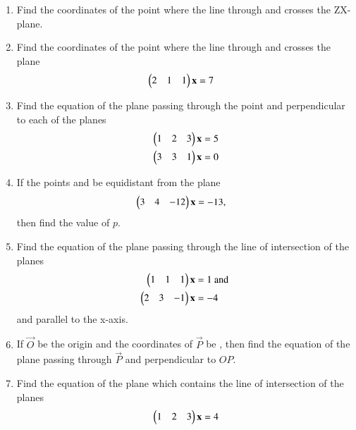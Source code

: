 \begin{enumerate}[label=\arabic*.,ref=\thesubsection.\theenumi]
\item Find the coordinates of the point where the line through  and  crosses the ZX-plane.
\item Find the coordinates of the point where the line through  and  crosses the plane 
\begin{align}
\begin{pmatrix}2 & 1 & 1\end{pmatrix}\mathbf{x}&=7
\end{align}
%
\item Find the equation of the plane passing through the point  and perpendicular to each of the planes 
\begin{align}
\begin{pmatrix}1 & 2 & 3\end{pmatrix}\mathbf{x}&=5
\\
\begin{pmatrix}3 & 3 & 1\end{pmatrix}\mathbf{x}&=0
\end{align}
\item If the points  and  be equidistant from the plane 
\begin{align}
\begin{pmatrix}3 & 4 & -12\end{pmatrix}\mathbf{x}&=-13,
\end{align}
%
then find the value of $p$.
\item Find the equation of the plane passing through the line of intersection of the planes 
\begin{align}
\begin{pmatrix}1 & 1 & 1\end{pmatrix}\mathbf{x}&=1 \text{ and }
\\
\begin{pmatrix}2 & 3 & -1\end{pmatrix}\mathbf{x}&=-4
\end{align}
%
and parallel to the x-axis.
\item If $\vec{O}$ be the origin and the coordinates of $\vec{P}$ be , then find the equation of the plane passing through $\vec{P}$ and perpendicular to $OP$.
%
\item Find the equation of the plane which contains the line of intersection of the planes 
%
\begin{align}
\myvec{1 & 2 & 3}\vec{x}&=4 
\\

\end{align}
\end{enumerate}
